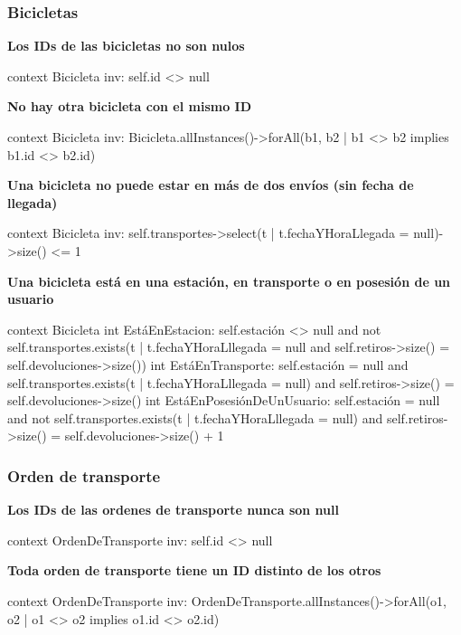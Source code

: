\documentclass[a4paper, 10pt, twoside]{article}
\newenvironment{ocl}[1]
  {
    \textbf{#1}
    \verbatim
  }{
    \endverbatim
  }
\begin{document}
\subsubsection{Bicicletas}

\begin{ocl}{Los IDs de las bicicletas no son nulos}
  context Bicicleta
  inv: self.id <> null
\end{ocl}

\begin{ocl}{No hay otra bicicleta con el mismo ID}
  context Bicicleta
  inv: Bicicleta.allInstances()->forAll(b1, b2 | b1 <> b2 implies b1.id <> b2.id)
\end{ocl}

\begin{ocl}{Una bicicleta no puede estar en más de dos envíos (sin fecha de llegada)}
  context Bicicleta
  inv: self.transportes->select(t | t.fechaYHoraLlegada = null)->size() <= 1
\end{ocl}

\begin{ocl}{Una bicicleta está en una estación, en transporte o en posesión de un usuario}
  context Bicicleta
  int EstáEnEstacion: self.estación <> null and
                      not self.transportes.exists(t |
                          t.fechaYHoraLllegada = null and
                          self.retiros->size() = self.devoluciones->size())
  int EstáEnTransporte: self.estación = null and
                        self.transportes.exists(t | t.fechaYHoraLllegada = null) and
                        self.retiros->size() = self.devoluciones->size()
  int EstáEnPosesiónDeUnUsuario: self.estación = null and
                                 not self.transportes.exists(t |
                                     t.fechaYHoraLllegada = null) and
                                 self.retiros->size() = self.devoluciones->size() + 1
\end{ocl}


\subsubsection{Orden de transporte}

\begin{ocl}{Los IDs de las ordenes de transporte nunca son null}
  context OrdenDeTransporte
  inv: self.id <> null
\end{ocl}

\begin{ocl}{Toda orden de transporte tiene un ID distinto de los otros}
  context OrdenDeTransporte
  inv: OrdenDeTransporte.allInstances()->forAll(o1, o2 |
           o1 <> o2 implies o1.id <> o2.id)
\end{ocl}
\end{document}
